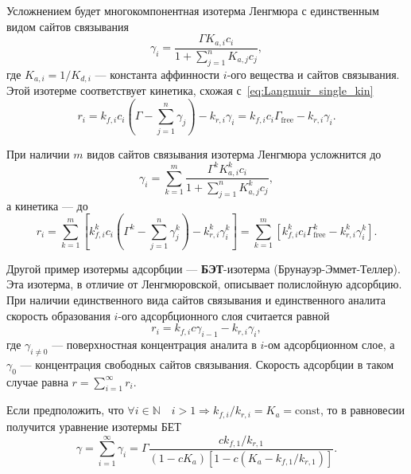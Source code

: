 \documentclass[oneside,final,12pt]{extreport}
\begin{document}
Усложнением будет многокомпонентная изотерма Ленгмюра с единственным видом
сайтов связывания
\begin{equation}
  \gamma_i = \frac{\Gamma K_{a,i} c_i}{1 + \sum\limits_{j=1}^{n} K_{a,j} c_j},
\label{eq:Langmuir_multi_eq}
\end{equation}
где $K_{a,i} = 1/K_{d,i}$ --- константа аффинности $i$-ого вещества и
сайтов связывания. Этой изотерме соответствует кинетика,
схожая с~\eqref{eq:Langmuir_single_kin}
\begin{equation}
  r_i = k_{f,i} c_i \left(\Gamma - \sum_{j=1}^{n} \gamma_j\right) - k_{r,i}\gamma_i =
        k_{f,i} c_i \Gamma_{\text{free}} - k_{r,i}\gamma_i.
\label{eq:Langmuir_multi_kin}
\end{equation}

При наличии $m$ видов сайтов связывания изотерма Ленгмюра усложнится до
\begin{equation}
  \gamma_i = \sum_{k=1}^{m}\frac{\Gamma^k K_{a,i}^k c_i}{1 + \sum\limits_{j=1}^{n} K_{a,j}^k c_j},
\label{eq:Langmuir_multi_many_eq}
\end{equation}
а кинетика --- до
\begin{equation}
  r_i = \sum_{k=1}^{m} \left[
            k_{f,i}^k c_i \left(\Gamma^k - \sum_{j=1}^{n} \gamma_j^k\right) - k_{r,i}^k\gamma_i^k
          \right] =
        \sum_{k=1}^{m} \left[
            k_{f,i}^k c_i \Gamma_{\text{free}}^k - k_{r,i}^k\gamma_i^k
          \right].
\label{eq:Langmuir_multi_many_kin}
\end{equation}


Другой пример изотермы адсорбции ---
\textbf{БЭТ}-изотерма (Брунауэр-Эммет-Теллер).
Эта изотерма, в отличие от Ленгмюровской, описывает полислойную адсорбцию.
При наличии единственного вида сайтов связывания и единственного аналита
скорость образования $i$-ого адсорбционного слоя считается равной
\begin{equation}
  r_i = k_{f,i} c \gamma_{i-1} - k_{r,i} \gamma_{i},
\label{eq:BET_ith_layer_deriv}
\end{equation}
где $\gamma_{i \neq 0}$ --- поверхностная концентрация аналита в
$i$-ом адсорбционном слое, а
$\gamma_0$ --- концентрация свободных сайтов связывания.
Скорость адсорбции в таком случае равна $r = \sum_{i=1}^{\infty} r_i$.

Если предположить, что
$\forall i \in \mathbb{N} \quad i > 1 \Rightarrow
k_{f,i}/k_{r,i} = K_a = \text{const}$,
то в равновесии получится уравнение изотермы БЕТ
\begin{equation}
  \gamma = \sum_{i=1}^{\infty}\gamma_i =
    \Gamma\frac{ck_{f,1}/k_{r,1}}
               {\left(1 - cK_a\right)
                \left[1 - c\left(K_a - k_{f,1}/k_{r,1}\right)\right]}.
\label{eq:BET_isotherm}
\end{equation}
\end{document}
